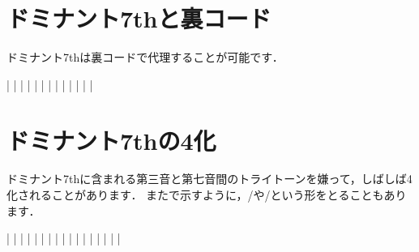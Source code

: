 \documentclass[dvipdfmx,uplatex,b5paper,openany,jbase=12Q,nomag*,textwidth-limit=44%
               ]{gachimuchi}[2020/05/05]
\begin{document}
\section{ドミナント7thと裏コード}
ドミナント7thは裏コードで代理することが可能です．

\begin{Music}
  \generalmeter{\meterC}%
  \Startpiece%
  \NOTes%
  |%
  \en%
  \NOTes%
  |%
  \en%
  \bar%
  \NOTes%
  |%
  \en%
  \NOTes%
  |%
  \en%
  \bar%
  \NOtes%
  |%
  \en%
  \NOtes%
  |%
  \en%
  \NOTes%
  |%
  \en%
  \bar%
  \NOTEs%
  |%
  \en%
  \bar%
  \NOTEs%
  |%
  \en%
  \setdoubleBAR\endpiece
\end{Music}
\section{ドミナント7thの\Sus4化}
ドミナント7thに含まれる第三音と第七音間のトライトーンを嫌って，しばしば\Sus4化されることがあります．
またで示すように，\Gniv/\Gnv や\Gnii\Min{}/\Gnv という形をとることもあります．

\begin{Music}
  \generalmeter{\meterC}%
  \Startpiece%
  \NOTEs%
  |%
  \en%
  \bar%
  \NOTEs%
  |%
  \en%
  \bar%
  \NOTEs%
  |%
  \en%
  \bar%
  \NOTEs%
  |%
  \en%
  \bar%
  \NOTEs%
  |%
  \en%
  \doubleBAR
  \NOTes\Mryaku\sk|\Mryaku\sk\en
  \NOTes%
  |\en%
  \bar%
  \NOTEs%
  |%
  \en%
  \doubleBAR
  \NOTes\Mryaku\sk|\Mryaku\sk\en
  \NOTes%
  |\en%
  \bar%
  \NOTEs%
  |%
  \en%
  \setdoubleBAR\endpiece
\end{Music}
\end{document}

